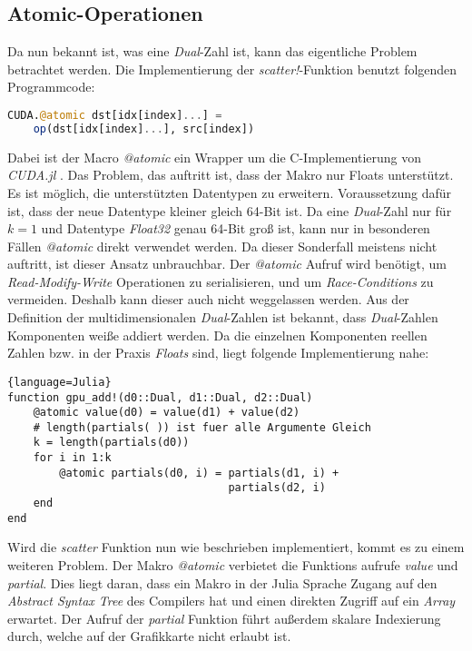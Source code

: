 \subsection{Atomic-Operationen} \label{sec:atomic}

Da nun bekannt ist, was eine \textit{Dual}-Zahl ist, 
kann das eigentliche Problem betrachtet werden.
Die Implementierung der \textit{scatter!}-Funktion benutzt folgenden Programmcode:
\begin{lstlisting}[language=Julia]
CUDA.@atomic dst[idx[index]...] = 
	op(dst[idx[index]...], src[index])
\end{lstlisting}
Dabei ist der Macro \textit{@atomic} ein Wrapper um die C-Implementierung von \textit{CUDA.jl} \cite{besard2018juliagpu}.
Das Problem, das auftritt ist, dass der Makro nur Floats unterstützt.
Es ist möglich, die unterstützten Datentypen zu erweitern.
Voraussetzung dafür ist, dass der neue Datentype kleiner gleich 64-Bit ist.
Da eine \textit{Dual}-Zahl nur für $k = 1$ und Datentype \textit{Float32} genau 64-Bit groß ist,
kann nur in besonderen Fällen \textit{@atomic} direkt verwendet werden.
Da dieser Sonderfall meistens nicht auftritt, ist dieser Ansatz unbrauchbar.
Der \textit{@atomic} Aufruf wird benötigt,
um \textit{Read-Modify-Write} Operationen zu serialisieren, 
und um \textit{Race-Conditions} zu vermeiden. 
Deshalb kann dieser auch nicht weggelassen werden.
Aus der Definition der multidimensionalen \textit{Dual}-Zahlen 
ist bekannt, dass \textit{Dual}-Zahlen Komponenten weiße addiert werden.
Da die einzelnen Komponenten reellen Zahlen 
bzw. in der Praxis \textit{Floats} sind, liegt folgende Implementierung nahe:
\begin{lstlisting}{language=Julia}
function gpu_add!(d0::Dual, d1::Dual, d2::Dual)
	@atomic value(d0) = value(d1) + value(d2)
    # length(partials( )) ist fuer alle Argumente Gleich
	k = length(partials(d0)) 
	for i in 1:k
		@atomic partials(d0, i) = partials(d1, i) + 
                                  partials(d2, i)
	end
end

\end{lstlisting}

Wird die \textit{scatter} Funktion nun wie beschrieben implementiert, kommt es zu einem weiteren Problem.
Der Makro \textit{@atomic} verbietet die Funktions aufrufe \textit{value} und \textit{partial}.
Dies liegt daran, dass ein Makro in der Julia Sprache Zugang auf den \textit{Abstract Syntax Tree} des Compilers hat
und einen direkten Zugriff auf ein \textit{Array} erwartet.
Der Aufruf der \textit{partial} Funktion führt außerdem skalare Indexierung durch, welche auf der Grafikkarte nicht erlaubt ist.